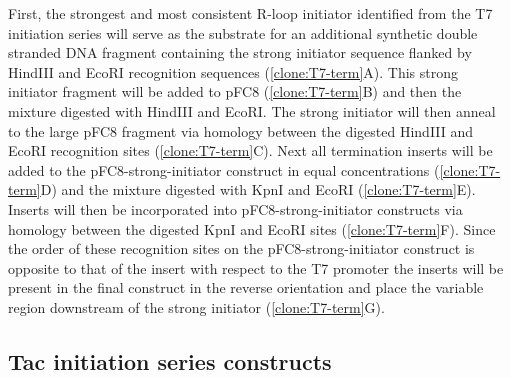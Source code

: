 \documentclass[11pt]{article}
\begin{document}
 First, the strongest and most consistent R-loop initiator identified from the T7 initiation series will serve as the substrate for an additional synthetic double stranded DNA fragment containing the strong initiator sequence flanked by  HindIII and EcoRI recognition sequences (\ref{clone:T7-term}A). This strong initiator fragment will be added to pFC8  (\ref{clone:T7-term}B) and then the mixture digested with HindIII and EcoRI. The strong initiator will then anneal to the large pFC8 fragment via homology between the digested HindIII and EcoRI recognition sites (\ref{clone:T7-term}C). Next all termination inserts will be added to the pFC8-strong-initiator construct in equal concentrations (\ref{clone:T7-term}D) and the mixture digested with KpnI and EcoRI (\ref{clone:T7-term}E). Inserts will then be incorporated into pFC8-strong-initiator constructs via homology between the digested KpnI and EcoRI sites (\ref{clone:T7-term}F). Since the order of these recognition sites on the pFC8-strong-initiator construct is opposite to that of the insert with respect to the T7 promoter the inserts will be present in the final construct in the reverse orientation and place the variable region downstream of the strong initiator (\ref{clone:T7-term}G). 
 

\subsection{Tac initiation series constructs}
\label{sec:tac-init}
\end{document}
